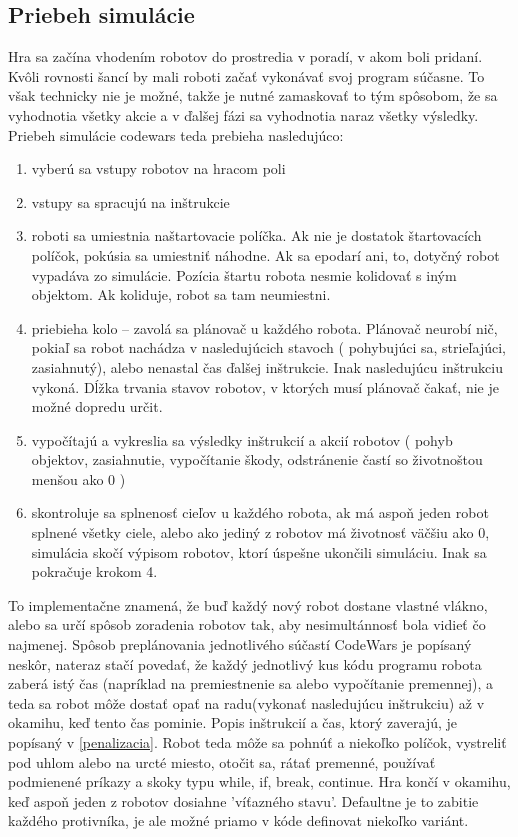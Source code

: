 \subsection {Priebeh simulácie}
Hra sa začína vhodením robotov do prostredia v poradí, v akom boli pridaní. Kvôli rovnosti šancí by mali roboti začať vykonávať svoj program súčasne. To však technicky nie je možné, takže je nutné zamaskovať to tým spôsobom, že sa vyhodnotia všetky akcie a v ďalšej fázi sa vyhodnotia naraz všetky výsledky. \\
 Priebeh simulácie codewars teda prebieha nasledujúco:
 \begin {enumerate}
\item vyberú sa vstupy robotov na hracom poli
\item vstupy sa spracujú na inštrukcie
\item roboti sa umiestnia naštartovacie políčka. Ak nie je dostatok štartovacích políčok, pokúsia sa umiestniť náhodne. Ak sa epodarí ani, to, dotyčný robot vypadáva zo simulácie. Pozícia štartu robota nesmie kolidovať s iným objektom. Ak koliduje, robot sa tam neumiestni.
\item priebieha kolo – zavolá sa plánovač u každého robota. Plánovač neurobí nič, pokiaľ sa robot nachádza v nasledujúcich stavoch ( pohybujúci sa, strieľajúci, zasiahnutý), alebo nenastal čas ďalšej inštrukcie. Inak nasledujúcu inštrukciu vykoná. Dĺžka trvania stavov robotov, v ktorých musí plánovač čakať, nie je možné dopredu určit.
\item vypočítajú a vykreslia sa výsledky inštrukcií a akcií robotov ( pohyb objektov, zasiahnutie, vypočítanie škody, odstránenie častí so životnoštou menšou ako 0 )
	\item skontroluje sa splnenosť cieľov u každého robota, ak má aspoň jeden robot splnené všetky ciele, alebo ako jediný z robotov má životnosť väčšiu ako 0, simulácia skočí výpisom robotov, ktorí úspešne ukončili simuláciu. Inak sa pokračuje krokom 4.
\end{enumerate}
To implementačne znamená, že buď každý nový robot dostane vlastné vlákno, alebo sa určí spôsob zoradenia robotov tak, aby nesimultánnosť bola vidieť čo najmenej. Spôsob preplánovania jednotlivého súčastí CodeWars je popísaný neskôr, nateraz stačí povedať, že každý jednotlivý kus kódu programu robota zaberá istý čas (napríklad na premiestnenie sa alebo vypočítanie premennej), a teda sa robot môže dostať opať na radu(vykonať nasledujúcu inštrukciu) až v okamihu, keď tento čas pominie. Popis inštrukcií a čas, ktorý zaverajú, je popísaný v \ref{penalizacia}. Robot teda môže sa pohnúť a niekoľko políčok, vystreliť pod uhlom alebo na urcté miesto, otočit sa, rátať premenné, používať podmienené príkazy a skoky typu while, if, break, continue. Hra končí v okamihu, keď aspoň jeden z robotov dosiahne 'víťazného stavu'. Defaultne je to zabitie každého protivníka, je ale možné priamo v kóde definovat niekoľko variánt.\\
